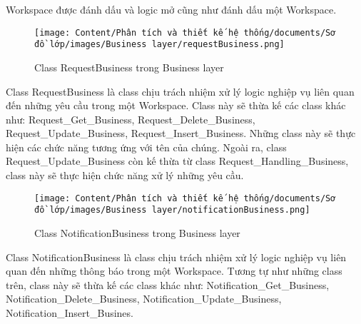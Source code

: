 Workspace được đánh dấu và logic mở cũng như đánh dấu một Workspace.
\begin{figure}[H]
    \centering
    \texttt{[image: Content/Phân tích và thiết kế hệ thống/documents/Sơ đồ lớp/images/Business layer/requestBusiness.png]}
    \vspace{0.5cm}
    \caption{Class RequestBusiness trong Business layer}
    \label{fig:Class RequestBusiness trong Business layer}
\end{figure}
\par
Class RequestBusiness là class chịu trách nhiệm xử lý logic nghiệp vụ liên quan đến
những yêu cầu trong một Workspace. Class này sẽ thừa kế các class khác như:
Request\_Get\_Business, Request\_Delete\_Business, Request\_Update\_Business, Request\_Insert\_Business.
Những class này sẽ thực hiện các chức năng tương ứng với tên của chúng. Ngoài ra, class
Request\_Update\_Business còn kế thừa từ class Request\_Handling\_Business, class này sẽ thực
hiện chức năng xử lý những yêu cầu.
\begin{figure}[H]
    \centering
    \texttt{[image: Content/Phân tích và thiết kế hệ thống/documents/Sơ đồ lớp/images/Business layer/notificationBusiness.png]}
    \vspace{0.5cm}
    \caption{Class NotificationBusiness trong Business layer}
    \label{fig:Class NotificationBusiness trong Business layer}
\end{figure}
\par
Class NotificationBusiness là class chịu trách nhiệm xử lý logic nghiệp vụ liên quan đến
những thông báo trong một Workspace. Tương tự như những class trên, class này sẽ thừa kế các class khác như:
Notification\_Get\_Business, Notification\_Delete\_Business, Notification\_Update\_Business, Notification\_Insert\_Busines.
